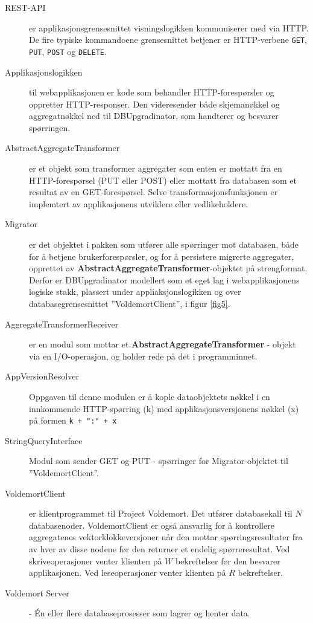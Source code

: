 \begin{description}
  \item [REST-API] er applikasjonsgrensesnittet visningslogikken kommuniserer med via HTTP. De fire typiske kommandoene grensesnittet betjener er HTTP-verbene \texttt{GET}, \texttt{PUT}, \texttt{POST} og \texttt{DELETE}.
  \item [Applikasjonslogikken] til webapplikasjonen er kode som behandler HTTP-forespørsler og oppretter HTTP-responser. Den videresender både skjemanøkkel og aggregatnøkkel ned til DBUpgradinator, som handterer og besvarer spørringen.
  \item [AbstractAggregateTransformer] er et objekt som transformer aggregater som enten er mottatt fra en HTTP-forespørsel (PUT eller POST) eller mottatt fra databasen som et resultat av en GET-forespørsel. Selve transformasjonsfunksjonen er implemtert av applikasjonens utviklere eller vedlikeholdere.
  \item [Migrator] er det objektet i pakken som utfører alle spørringer mot databasen, både for å betjene brukerforespørsler, og for å persistere migrerte aggregater, opprettet av \textbf{Abstract}\-\textbf{Aggregate}\-\textbf{Transformer}-objektet på strengformat. Derfor er DBUpgradinator modellert som et eget lag i webapplikasjonens logiske stakk, plassert under appliaksjonslogikken og over databasegrensesnittet ''VoldemortClient'', i figur \ref{fig5}.
  \item [AggregateTransformerReceiver] er en modul som mottar et \textbf{AbstractAggregateTransformer} - objekt via en I/O-operasjon, og holder rede på det i programminnet.
  \item [AppVersionResolver] Oppgaven til denne modulen er å kople dataobjektets nøkkel i en innkommende HTTP-spørring (k) med applikasjonsversjonens nøkkel (x) på formen \texttt{k + ":" + x}
  \item [StringQueryInterface] Modul som sender GET og PUT - spørringer for Migrator-objektet til ''VoldemortClient''.
  \item [VoldemortClient] er klientprogrammet til Project Voldemort. Det utfører databasekall til \(N\) databasenoder. VoldemortClient er også ansvarlig for å kontrollere aggregatenes vektorklokke\-versjoner når den mottar spørringsresultater fra av hver av disse nodene før den returner et endelig spørreresultat. Ved skriveoperasjoner venter klienten på \(W\) bekreftelser før den besvarer applikasjonen. Ved leseoperasjoner  venter klienten på \(R\) bekreftelser. 
  \item [Voldemort Server] - Én eller flere databaseprosesser som lagrer og henter data.
\end{description}

